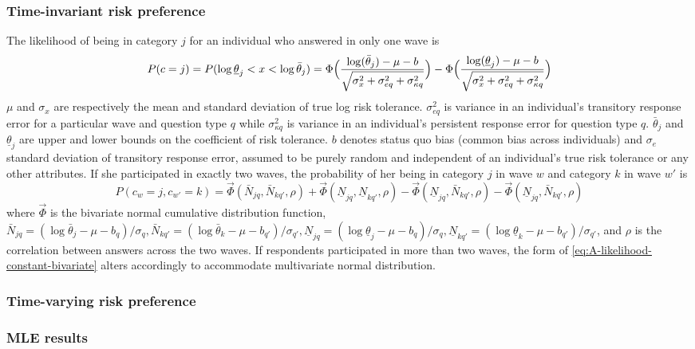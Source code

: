 \documentclass[]{article}
\begin{document}
\subsubsection{Time-invariant risk preference}
The likelihood of being in category $j$ for an individual who answered in only one wave is 
\begin{equation}
P(c=j)=P(\log\underline{\theta}_j<x<\log\bar{\theta}_j)=\Phi\Big({\log(\bar{\theta}_j)-\mu-b\over\sqrt{\sigma_x^2+\sigma_{eq}^2+\sigma_{\kappa q}^2}}\Big)-\Phi\Big({\log(\underline{\theta}_j)-\mu-b\over\sqrt{\sigma_x^2+\sigma_{eq}^2+\sigma_{\kappa q}^2}}\Big) 
\label{eq:A-likelihood-constant-univariate}	
\end{equation}
$\mu$ and $\sigma_x$ are respectively the mean and standard deviation of true log risk tolerance. $\sigma_{eq}^2$ is variance in an individual's transitory response error for a particular wave and question type $q$ while $\sigma_{\kappa q}^2$ is variance in an individual's persistent response error for question type $q$. $\bar \theta_j$ and $\underline{\theta}_j$ are upper and lower bounds on the coefficient of risk tolerance. $b$ denotes status quo bias (common bias across individuals) and $\sigma_e$ standard deviation of transitory response error, assumed to be purely random and independent of an individual's true risk tolerance or any other attributes. If she participated in exactly two waves, the probability of her being in category $j$ in wave $w$ and category $k$ in wave $w'$ is
\begin{equation}
P(c_w=j, c_{w'}=k)=\vec{\Phi}(\bar N_{jq}, \bar N_{kq'},\rho)+\vec{\Phi}(\underline N_{jq}, \underline N_{kq'},\rho)-\vec{\Phi}(\underline N_{jq}, \bar N_{kq'},\rho)-\vec{\Phi}(\underline N_{jq}, \bar N_{kq'},\rho)
\label{eq:A-likelihood-constant-bivariate}
\end{equation}
where $\vec{\Phi}$ is the bivariate normal cumulative distribution function, $\bar N_{jq}=(\log \bar \theta_j-\mu-b_q)/\sigma_q,\bar N_{kq'}=(\log \bar \theta_k-\mu-b_{q'})/\sigma_{q'}, \underline N_{jq}=(\log \underline \theta_j-\mu-b_q)/\sigma_q, \underline N_{kq'}=(\log \underline \theta_k-\mu-b_{q'})/\sigma_{q'}$, and $\rho$ is the correlation between answers across the two waves. If respondents participated in more than two waves, the form of \eqref{eq:A-likelihood-constant-bivariate} alters accordingly to accommodate multivariate normal distribution.

\subsubsection{Time-varying risk preference}



\subsubsection{MLE results}


\pagebreak



\end{document}

